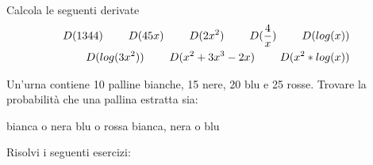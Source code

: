 \documentclass[addpoints]{exam}
\begin{document}
\begin{questions}
	
\question[3] Calcola le seguenti derivate
	\begin{align*}
	D(1344) \hspace{8mm}
	D(45x) \hspace{8mm}
	D(2x^2) \hspace{8mm}
	D(\frac{4}{x}) \hspace{8mm}
	D(log(x)) \\
	D(log(3x^2)) \hspace{8mm}
	D(x^2+3x^3-2x) \hspace{8mm}
	D(x^2*log(x))
	\end{align*}
	
\question[1] Un'urna contiene 10 palline bianche, 15 nere, 20 blu e 25 rosse. Trovare la probabilità che una pallina estratta sia:
\begin{checkboxes}
	\choice bianca o nera 
	\choice blu o rossa
	\choice bianca, nera o blu
\end{checkboxes}

\question Risolvi i seguenti esercizi:

\end{questions}


\begin{center}
	\gradetable[h][questions]
\end{center}
\end{document}

